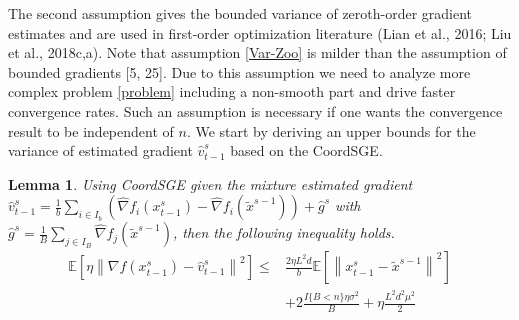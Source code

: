 \documentclass{article}
\newcommand*{\E}{\mathbb{E}}
\newcommand{\norm}[1]{\left\lVert#1\right\rVert}
\newtheorem{lemma}[theorem]{Lemma}
\theoremstyle{definition}
\theoremstyle{remark}
\begin{document}
{\color{Green} The second assumption gives the bounded variance of zeroth-order gradient estimates and are used in first-order optimization literature (Lian et al., 2016; Liu et al., 2018c,a). {\color{Brown}
Note that assumption \ref{Var-Zoo} is milder than the assumption of bounded gradients [5, 25].}
{\color{Green}Due to this assumption we need to analyze more complex problem \eqref{problem} including a non-smooth part and drive faster convergence rates.} {\color{Violet}Such an assumption is necessary if one wants the convergence result to be independent of $n$.
}
{\color{Green}
We start by deriving an upper bounds for the variance of estimated gradient $\hat{v}_{t-1}^s$ based on the CoordSGE.}
}
\begin{lemma}\label{var-estimate-lem}
Using CoordSGE given the mixture estimated gradient $\hat{v}_{t-1}^s = \frac{1}{b} \sum_{i\in I_b}\left(\hat{\nabla} f_{i}(x_{t-1}^s)-\hat{\nabla} f_{i}(\tilde{x}^{s-1})\right)+\hat{g}^s$ with $\hat{g}^s = \frac{1}{B} \sum_{j\in I_B} \hat{\nabla} f_j (\widetilde{x}^{s-1})$, then the following inequality holds. 
\begin{equation}
\begin{split}
\E\left[\eta\norm{\nabla f(x_{t-1}^s)-{\hat{v}_{t-1}^s}}^2\right] \leq&  \frac{2\eta L^2 d}{b}\E\left[\norm{x_{t-1}^s-\widetilde{x}^{s-1}}^2\right]\\
&+ 2\frac{I\{B < n\}\eta \sigma ^2}{B}+\eta \frac{L^2 d^2 \mu^2}{2}
\end{split}
\end{equation}
\end{lemma}
\end{document}
